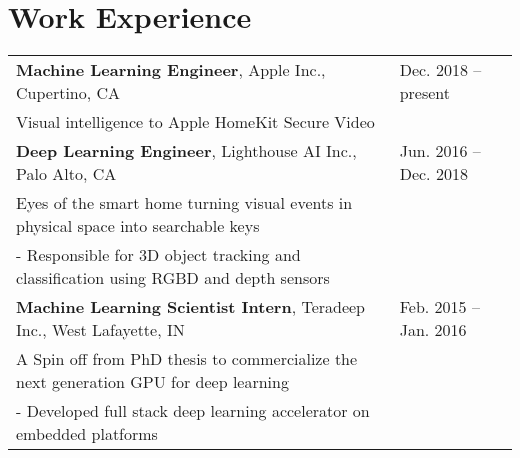 \documentclass[11pt]{article}
\begin{document}
\section*{Work Experience}
\begin{tabular}{L{0.74\textwidth} R{0.22\textwidth}}
  {\bf Machine Learning Engineer}, Apple Inc., Cupertino, CA                       & Dec. 2018 -- present \\ [0pt]
  Visual intelligence to Apple HomeKit Secure Video \\ [7pt]
  {\bf Deep Learning Engineer}, Lighthouse AI Inc., Palo Alto, CA                  & Jun. 2016 -- Dec. 2018 \\ [0pt]
  Eyes of the smart home turning visual events in physical space into searchable keys \\
  - Responsible for 3D object tracking and classification using RGBD and depth sensors \\ [7pt]
  {\bf Machine Learning Scientist Intern}, Teradeep Inc., West Lafayette, IN       & Feb. 2015 -- Jan. 2016 \\ [0pt]
  A Spin off from PhD thesis to commercialize the next generation GPU for deep learning \\
  - Developed full stack deep learning accelerator on embedded platforms \\ [7pt]
\end{tabular}
\end{document}
